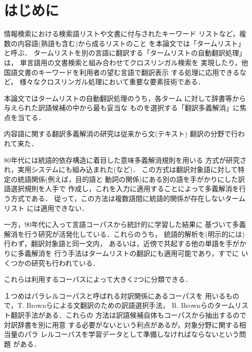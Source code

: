 


\maketitle

\section{はじめに}

情報検索における検索語リストや文書に付与されたキーワード
リストなど，複数の内容語(熟語も含む)から成るリストのこと
を本論文では「タームリスト」と呼ぶ．
タームリストを別の言語に翻訳する「タームリストの自動翻訳処理」は，
単言語用の文書検索と組み合わせてクロスリンガル検索\cite{Oard96}を
実現したり，他国語文書のキーワードを利用者の望む言語で翻訳表示
する処理\cite{Suzuki97j}に応用できるなど，
様々なクロスリンガル処理において重要な要素技術である．

本論文ではタームリストの自動翻訳処理のうち，各ターム
に対して辞書等から与えられた訳語候補の中から最も妥当な
ものを選択する「翻訳多義解消」に焦点を当てる．

内容語に関する翻訳多義解消の研究は従来から文(テキスト)
翻訳の分野で行われて来た．

80年代には統語的依存構造に着目した意味多義解消規則を用いる
方式が研究され，実用システムにも組み込まれた(\cite{Nagao85}など)．
この方式は翻訳対象語に対して特定の統語関係(例えば，目的語と
動詞の関係)にある別の語を手がかりにした訳語選択規則を人手で
作成し，これを入力に適用することによって多義解消を行う方式である．
従って，この方法は複数語間に統語的関係が存在しないタームリスト
には適用できない．

一方，90年代に入って言語コーパスから統計的に学習した結果に
基づいて多義解消を行う研究が活発化している．これらのうち，
統語的解析を(明示的には)行わず，翻訳対象語と同一文内，
あるいは，近傍で共起する他の単語を手がかりに多義解消を
行う手法はタームリストの翻訳にも適用可能であり，すでに
いくつかの研究も行われている．

これらは利用するコーパスによって大きく2つに分類できる． 

  １つめはパラレルコーパスと呼ばれる対訳関係にあるコーパスを
用いるもので，T. Brownらによる文翻訳のための訳語選択手法\cite{Brown91}，
R. Brownらのタームリスト翻訳手法\cite{Brown97}がある．これらの
方法は訳語候補自体もコーパスから抽出するので対訳辞書を別に用意
する必要がないという利点があるが，対象分野に関する相当量のパラ
レルコーパスを学習データとして準備しなければならないという問題
がある．

